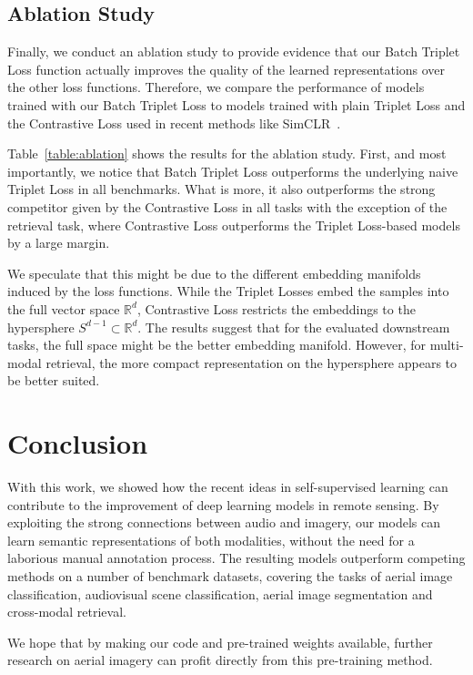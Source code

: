 \documentclass[journal]{IEEEtran}
\begin{document}
\subsection{Ablation Study}\label{sect:ablation}
Finally, we conduct an ablation study to provide evidence
that our Batch Triplet Loss function actually improves
the quality of the learned representations over the other loss functions.
Therefore, we compare the performance of models trained with our Batch Triplet Loss
to models trained with plain Triplet Loss
and the Contrastive Loss used in recent methods like SimCLR~\cite{simclr}.
 
Table~\ref{table:ablation} shows the results for the ablation study.
First, and most importantly, we notice that Batch Triplet Loss outperforms the
underlying naive Triplet Loss in all benchmarks.
What is more, it also outperforms the strong competitor given by the Contrastive Loss
in all tasks with the exception of the retrieval task,
where Contrastive Loss outperforms the Triplet Loss-based models by a large margin.

We speculate that this might be due to the different
embedding manifolds induced by the loss functions.
While the Triplet Losses embed the samples into the full vector space $\mathbb{R}^d$,
Contrastive Loss restricts the embeddings to the hypersphere $S^{d-1}\!\subset\!\mathbb{R}^d$.
The results suggest that for the evaluated downstream tasks,
the full space might be the better embedding manifold.
However, for multi-modal retrieval,
the more compact representation on the hypersphere
appears to be better suited.

\section{Conclusion}
With this work, we showed how the recent ideas in
self-supervised learning can contribute to the improvement of
deep learning models in remote sensing.
By exploiting the strong connections between audio and imagery,
our models can learn semantic representations of both modalities,
without the need for a laborious manual annotation process.
The resulting models outperform competing methods
on a number of benchmark datasets,
covering the tasks of
aerial image classification, audiovisual scene classification,
aerial image segmentation and cross-modal retrieval.

We hope that by making our code and pre-trained weights available,
further research on aerial imagery can profit directly from this
pre-training method.
\end{document}
